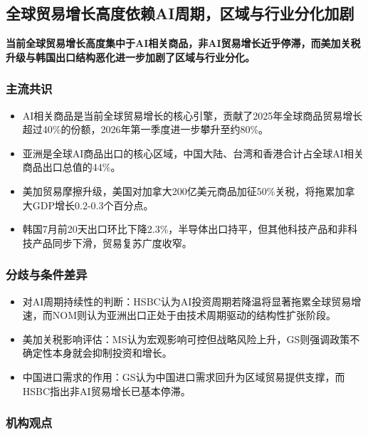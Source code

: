 \documentclass[11pt]{ctexart}
\begin{document}
\subsection{全球贸易增长高度依赖AI周期，区域与行业分化加剧}
\textbf{当前全球贸易增长高度集中于AI相关商品，非AI贸易增长近乎停滞，而美加关税升级与韩国出口结构恶化进一步加剧了区域与行业分化。}
\subsubsection*{主流共识}
\begin{itemize}
  \item AI相关商品是当前全球贸易增长的核心引擎，贡献了2025年全球商品贸易增长超过40\%的份额，2026年第一季度进一步攀升至约80\%。
  \item 亚洲是全球AI商品出口的核心区域，中国大陆、台湾和香港合计占全球AI相关商品出口总值的44\%。
  \item 美加贸易摩擦升级，美国对加拿大200亿美元商品加征50\%关税，将拖累加拿大GDP增长0.2-0.3个百分点。
  \item 韩国7月前20天出口环比下降2.3\%，半导体出口持平，但其他科技产品和非科技产品同步下滑，贸易复苏广度收窄。
\end{itemize}
\subsubsection*{分歧与条件差异}
\begin{itemize}
  \item 对AI周期持续性的判断：HSBC认为AI投资周期若降温将显著拖累全球贸易增速，而NOM则认为亚洲出口正处于由技术周期驱动的结构性扩张阶段。
  \item 美加关税影响评估：MS认为宏观影响可控但战略风险上升，GS则强调政策不确定性本身就会抑制投资和增长。
  \item 中国进口需求的作用：GS认为中国进口需求回升为区域贸易提供支撑，而HSBC指出非AI贸易增长已基本停滞。
\end{itemize}
\subsubsection*{机构观点}
\end{document}
